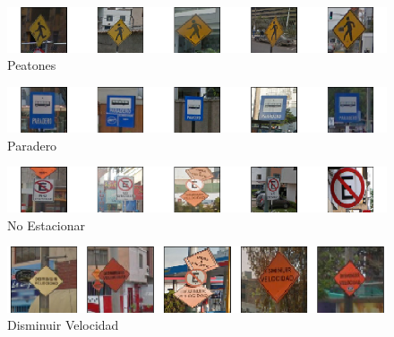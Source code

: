 			\begin{figure}[H]
				\begin{center}
				\includegraphics[width=1\textwidth]{images/desarrollo/imagenes/peru/1__(4).png}
				\end{center}
				\begin{center}
				\caption{\small{Peatones}}
				\end{center}
				\vspace{-1.5em}
			\end{figure}
			
			\begin{figure}[H]
				\begin{center}
				\includegraphics[width=1\textwidth]{images/desarrollo/imagenes/peru/1__(5).png}
				\end{center}
				\begin{center}
				\caption{\small{Paradero}}
				\end{center}
				\vspace{-1.5em}
			\end{figure}

			\begin{figure}[H]
				\begin{center}
				\includegraphics[width=1\textwidth]{images/desarrollo/imagenes/peru/1__(6).png}
				\end{center}
				\begin{center}
				\caption{\small{No Estacionar}}
				\end{center}
				\vspace{-1.5em}
			\end{figure}
			
			\begin{figure}[H]
				\begin{center}
				\includegraphics[width=1\textwidth]{images/desarrollo/imagenes/peru/1__(7).png}
				\end{center}
				\begin{center}
				\caption{\small{Disminuir Velocidad}}
				\end{center}
				\vspace{-1.5em}
			\end{figure}


